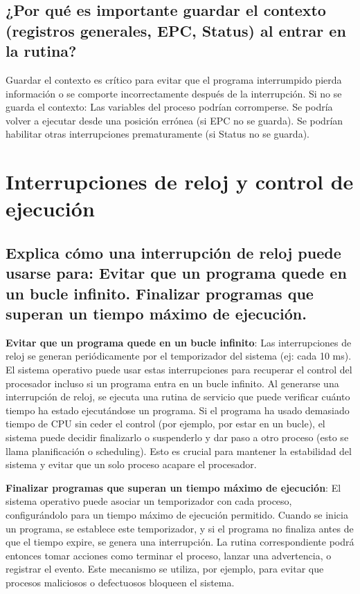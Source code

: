 \documentclass{article}
\begin{document}
\subsection{ ¿Por qué es importante guardar el contexto (registros generales, EPC, Status) al entrar en la rutina?}

Guardar el contexto es crítico para evitar que el programa interrumpido pierda información o se comporte incorrectamente después de la interrupción. Si no se guarda el contexto: Las variables del proceso podrían corromperse. Se podría volver a ejecutar desde una posición errónea (si EPC no se guarda). Se podrían habilitar otras interrupciones prematuramente (si Status no se guarda).

\section{Interrupciones de reloj y control de ejecución}

\subsection{Explica cómo una interrupción de reloj puede usarse para: Evitar que un programa quede en un bucle infinito.  Finalizar programas que superan un tiempo máximo de ejecución. }

\textbf{Evitar que un programa quede en un bucle infinito}:\newline
Las interrupciones de reloj se generan periódicamente por el temporizador del sistema (ej: cada 10 ms). El sistema operativo puede usar estas interrupciones para recuperar el control del procesador incluso si un programa entra en un bucle infinito. Al generarse una interrupción de reloj, se ejecuta una rutina de servicio que puede verificar cuánto tiempo ha estado ejecutándose un programa. Si el programa ha usado demasiado tiempo de CPU sin ceder el control (por ejemplo, por estar en un bucle), el sistema puede decidir finalizarlo o suspenderlo y dar paso a otro proceso (esto se llama planificación o scheduling). Esto es crucial para mantener la estabilidad del sistema y evitar que un solo proceso acapare el procesador.\newline

\textbf{Finalizar programas que superan un tiempo máximo de ejecución}:\newline
El sistema operativo puede asociar un temporizador con cada proceso, configurándolo para un tiempo máximo de ejecución permitido. Cuando se inicia un programa, se establece este temporizador, y si el programa no finaliza antes de que el tiempo expire, se genera una interrupción. La rutina correspondiente podrá entonces tomar acciones como terminar el proceso, lanzar una advertencia, o registrar el evento. Este mecanismo se utiliza, por ejemplo, para evitar que procesos maliciosos o defectuosos bloqueen el sistema.
\end{document}
